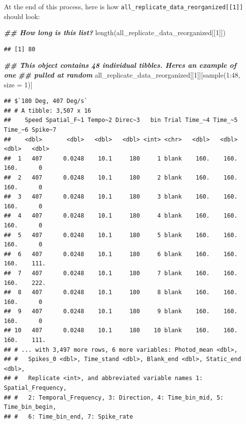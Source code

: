 \documentclass[
]{book}
\newenvironment{Shaded}{\begin{snugshade}}{\end{snugshade}}
\newcommand{\AttributeTok}[1]{\textcolor[rgb]{0.77,0.63,0.00}{#1}}
\newcommand{\DecValTok}[1]{\textcolor[rgb]{0.00,0.00,0.81}{#1}}
\newcommand{\DocumentationTok}[1]{\textcolor[rgb]{0.56,0.35,0.01}{\textbf{\textit{#1}}}}
\newcommand{\FunctionTok}[1]{\textcolor[rgb]{0.00,0.00,0.00}{#1}}
\newcommand{\NormalTok}[1]{#1}
\newcommand{\SpecialCharTok}[1]{\textcolor[rgb]{0.00,0.00,0.00}{#1}}
\begin{document}
At the end of this process, here is how \texttt{all\_replicate\_data\_reorganized{[}{[}1{]}{]}}
should look:

\begin{Shaded}
\begin{Highlighting}[]
\DocumentationTok{\#\# How long is this list?}
\FunctionTok{length}\NormalTok{(all\_replicate\_data\_reorganized[[}\DecValTok{1}\NormalTok{]])}
\end{Highlighting}
\end{Shaded}

\begin{verbatim}
## [1] 80
\end{verbatim}

\begin{Shaded}
\begin{Highlighting}[]
\DocumentationTok{\#\# This object contains 48 individual tibbles. Here\textquotesingle{}s an example of one}
\DocumentationTok{\#\# pulled at random}
\NormalTok{all\_replicate\_data\_reorganized[[}\DecValTok{1}\NormalTok{]][}\FunctionTok{sample}\NormalTok{(}\DecValTok{1}\SpecialCharTok{:}\DecValTok{48}\NormalTok{, }\AttributeTok{size =} \DecValTok{1}\NormalTok{)]}
\end{Highlighting}
\end{Shaded}

\begin{verbatim}
## $`180 Deg, 407 Deg/s`
## # A tibble: 3,507 x 16
##    Speed Spatial_F~1 Tempo~2 Direc~3   bin Trial Time_~4 Time_~5 Time_~6 Spike~7
##    <dbl>       <dbl>   <dbl>   <dbl> <int> <chr>   <dbl>   <dbl>   <dbl>   <dbl>
##  1   407      0.0248    10.1     180     1 blank    160.    160.    160.      0 
##  2   407      0.0248    10.1     180     2 blank    160.    160.    160.      0 
##  3   407      0.0248    10.1     180     3 blank    160.    160.    160.      0 
##  4   407      0.0248    10.1     180     4 blank    160.    160.    160.      0 
##  5   407      0.0248    10.1     180     5 blank    160.    160.    160.      0 
##  6   407      0.0248    10.1     180     6 blank    160.    160.    160.    111.
##  7   407      0.0248    10.1     180     7 blank    160.    160.    160.    222.
##  8   407      0.0248    10.1     180     8 blank    160.    160.    160.      0 
##  9   407      0.0248    10.1     180     9 blank    160.    160.    160.      0 
## 10   407      0.0248    10.1     180    10 blank    160.    160.    160.    111.
## # ... with 3,497 more rows, 6 more variables: Photod_mean <dbl>,
## #   Spikes_0 <dbl>, Time_stand <dbl>, Blank_end <dbl>, Static_end <dbl>,
## #   Replicate <int>, and abbreviated variable names 1: Spatial_Frequency,
## #   2: Temporal_Frequency, 3: Direction, 4: Time_bin_mid, 5: Time_bin_begin,
## #   6: Time_bin_end, 7: Spike_rate
\end{verbatim}
\end{document}
